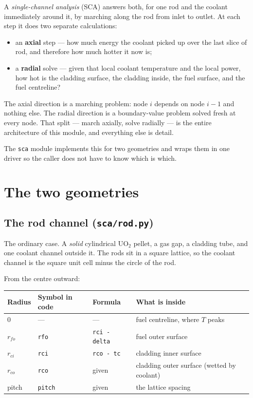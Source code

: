\documentclass[11pt]{article}
\newcommand{\code}[1]{\texttt{#1}}
\begin{document}
A \emph{single-channel analysis} (SCA) answers both, for one rod and the coolant
immediately around it, by marching along the rod from inlet to outlet. At each step it
does two separate calculations:

\begin{itemize}
\item an \textbf{axial} step --- how much energy the coolant picked up over the last
      slice of rod, and therefore how much hotter it now is;
\item a \textbf{radial} solve --- given that local coolant temperature and the local
      power, how hot is the cladding surface, the cladding inside, the fuel surface,
      and the fuel centreline?
\end{itemize}

The axial direction is a marching problem: node $i$ depends on node $i-1$ and nothing
else. The radial direction is a boundary-value problem solved fresh at every node. That
split --- march axially, solve radially --- is the entire architecture of this module,
and everything else is detail.

The \code{sca} module implements this for two geometries and wraps them in one driver so
the caller does not have to know which is which.

\section{The two geometries}

\subsection{The rod channel (\code{sca/rod.py})}

The ordinary case. A \emph{solid} cylindrical UO$_2$ pellet, a gas gap, a cladding
tube, and one coolant channel outside it. The rods sit in a square lattice, so the
coolant channel is the square unit cell minus the circle of the rod.

From the centre outward:

\begin{center}
\begin{tabular}{llll}
\toprule
Radius & Symbol in code & Formula & What is inside \\
\midrule
0 & --- & --- & fuel centreline, where $T$ peaks \\
$r_{fo}$ & \code{rfo} & \code{rci - delta} & fuel outer surface \\
$r_{ci}$ & \code{rci} & \code{rco - tc} & cladding inner surface \\
$r_{co}$ & \code{rco} & given & cladding outer surface (wetted by coolant) \\
pitch & \code{pitch} & given & the lattice spacing \\
\bottomrule
\end{tabular}
\end{center}
\end{document}
